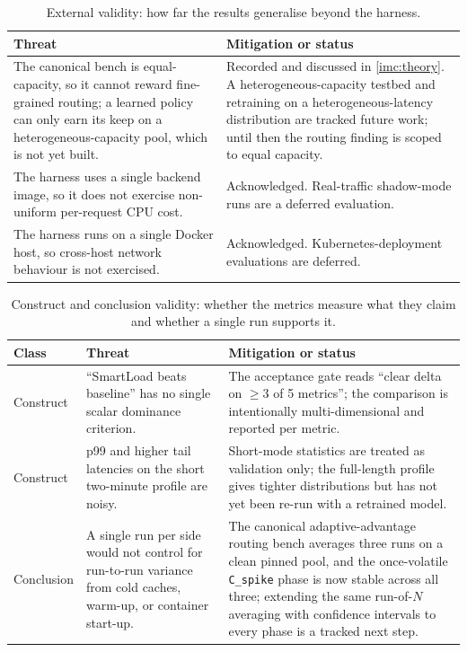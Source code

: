 \begin{table}[H]
  \centering
  \caption[External validity threats]{External validity: how far the results generalise beyond the harness.}
  \label{tab:imc:threats-external}
  \small
  \begin{tabularx}{\linewidth}{@{}Y Y@{}}
    \toprule
    \textbf{Threat} & \textbf{Mitigation or status} \\
    \midrule
    The canonical bench is equal-capacity, so it cannot reward fine-grained routing; a learned policy can only earn its keep on a heterogeneous-capacity pool, which is not yet built. & Recorded and discussed in \cref{imc:theory}. A heterogeneous-capacity testbed and retraining on a heterogeneous-latency distribution are tracked future work; until then the routing finding is scoped to equal capacity. \\
    The harness uses a single backend image, so it does not exercise non-uniform per-request CPU cost. & Acknowledged. Real-traffic shadow-mode runs are a deferred evaluation. \\
    The harness runs on a single Docker host, so cross-host network behaviour is not exercised. & Acknowledged. Kubernetes-deployment evaluations are deferred. \\
    \bottomrule
  \end{tabularx}
\end{table}

\begin{table}[H]
  \centering
  \caption[Construct and conclusion validity threats]{Construct and conclusion validity: whether the metrics measure what they claim and whether a single run supports it.}
  \label{tab:imc:threats-cc}
  \small
  \begin{tabularx}{\linewidth}{@{}l Y Y@{}}
    \toprule
    \textbf{Class} & \textbf{Threat} & \textbf{Mitigation or status} \\
    \midrule
    Construct  & ``SmartLoad beats baseline'' has no single scalar dominance criterion. & The acceptance gate reads ``clear delta on $\geq 3$ of 5 metrics''; the comparison is intentionally multi-dimensional and reported per metric. \\
    Construct  & p99 and higher tail latencies on the short two-minute profile are noisy. & Short-mode statistics are treated as validation only; the full-length profile gives tighter distributions but has not yet been re-run with a retrained model. \\
    Conclusion & A single run per side would not control for run-to-run variance from cold caches, warm-up, or container start-up. & The canonical adaptive-advantage routing bench averages three runs on a clean pinned pool, and the once-volatile \texttt{C\_spike} phase is now stable across all three; extending the same run-of-$N$ averaging with confidence intervals to every phase is a tracked next step. \\
    \bottomrule
  \end{tabularx}
\end{table}

